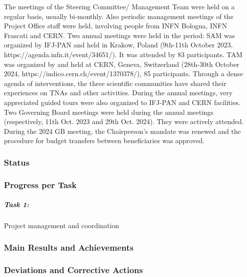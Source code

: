 The meetings of the Steering Committee/ Management Team were held on a regular basis, usually bi-monthly.
Also periodic management meetings of the Project Office staff were held, involving people from INFN Bologna, INFN Frascati and CERN.
Two annual meetings were held in the period: 
SAM was organized by IFJ-PAN and held in Krakow, Poland (9th-11th October 2023, https://agenda.infn.it/event/34651/). It was attended by 83 participants.
TAM was organized by and held at CERN, Geneva, Switzerland (28th-30th October 2024, https://indico.cern.ch/event/1370378/), 85 participants.
Through a dense agenda of interventions, the three scientific communities have shared their experiences on TNAs and other activities. During the annual meetings, very appreciated guided tours were also organized to IFJ-PAN and CERN facilities. 
Two Governing Board meetings were held during the annual meetings (respectively, 11th Oct. 2023 and 29th Oct. 2024). They were actively attended. During the 2024 GB meeting, the Chairperson's mandate was renewed and the procedure for budget transfers between beneficiaries was approved.


\subsubsection*{Status}


\subsubsection*{Progress per Task}

\subparagraph{Task 1: } Project management and coordination \mbox{}



\subsubsection*{Main Results and Achievements}


\subsubsection*{Deviations and Corrective Actions}
\label{sec:wp1_deviations}


